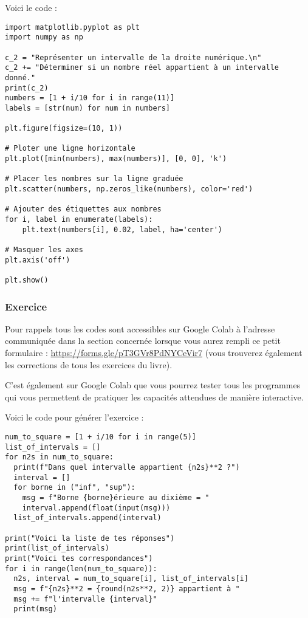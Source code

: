 \documentclass[a4paper, 11pt, twoside]{article}
\begin{document}
Voici le code :

\begin{verbatim}
import matplotlib.pyplot as plt
import numpy as np

c_2 = "Représenter un intervalle de la droite numérique.\n"
c_2 += "Déterminer si un nombre réel appartient à un intervalle donné."
print(c_2)
numbers = [1 + i/10 for i in range(11)]
labels = [str(num) for num in numbers]

plt.figure(figsize=(10, 1))

# Ploter une ligne horizontale
plt.plot([min(numbers), max(numbers)], [0, 0], 'k')

# Placer les nombres sur la ligne graduée
plt.scatter(numbers, np.zeros_like(numbers), color='red')

# Ajouter des étiquettes aux nombres
for i, label in enumerate(labels):
    plt.text(numbers[i], 0.02, label, ha='center')

# Masquer les axes
plt.axis('off')

plt.show()
\end{verbatim}

\subsubsection{Exercice}
\label{sec:org083f20c}
Pour rappels tous les codes sont accessibles sur Google Colab à
l'adresse communiquée dans la section concernée lorsque vous
aurez rempli ce petit formulaire :
\url{https://forms.gle/pT3GVr8PdNYCeVir7} (vous trouverez également
les corrections de tous les exercices du livre).

C'est également sur Google Colab que vous pourrez tester tous les
programmes qui vous permettent de pratiquer les capacités attendues
de manière interactive.

Voici le code pour générer l'exercice :

\begin{verbatim}
num_to_square = [1 + i/10 for i in range(5)]
list_of_intervals = []
for n2s in num_to_square:
  print(f"Dans quel intervalle appartient {n2s}**2 ?")
  interval = []
  for borne in ("inf", "sup"):
    msg = f"Borne {borne}érieure au dixième = "
    interval.append(float(input(msg)))
  list_of_intervals.append(interval)

print("Voici la liste de tes réponses")
print(list_of_intervals)
print("Voici tes correspondances")
for i in range(len(num_to_square)):
  n2s, interval = num_to_square[i], list_of_intervals[i]
  msg = f"{n2s}**2 = {round(n2s**2, 2)} appartient à "
  msg += f"l'intervalle {interval}"
  print(msg)
\end{verbatim}
\end{document}
